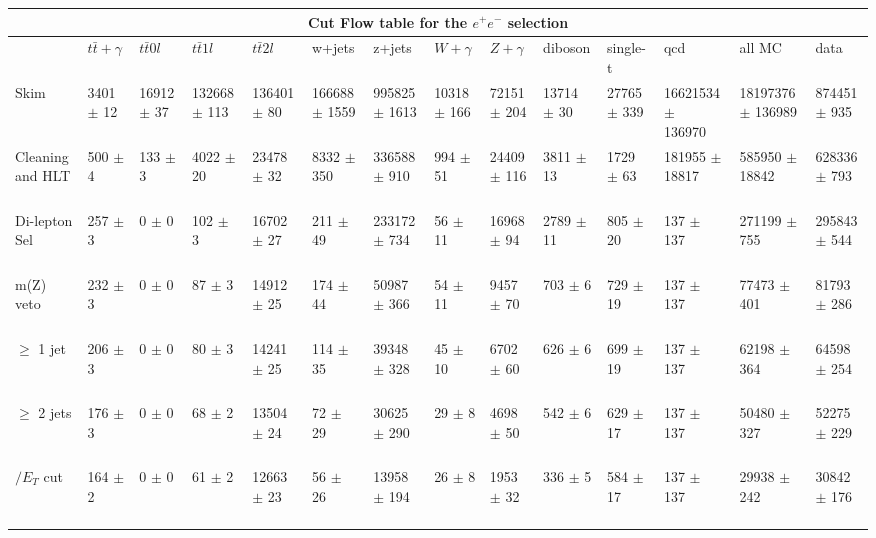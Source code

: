 \begin{table}
  \centering
\resizebox{\columnwidth}{!} {

\begin{tabular}{|l|l|l|l|l|l|l|l|l|l|l|l|l|l|}
\hline
\multicolumn{14}{|c|}{\textbf{Cut Flow table for the $e^+e^-$ selection}} \\
\hline
 & $t\bar{t}+\gamma$ & $t\bar{t} 0l$ & $t\bar{t} 1l$ & $t\bar{t} 2l$ & w+jets & z+jets & $W+\gamma$ & $Z+\gamma$ & diboson & single-t & qcd & all MC & data\\
 \hline
Skim & 3401 $\pm$ 12 \ & 16912 $\pm$ 37 \ & 132668 $\pm$ 113 \ & 136401 $\pm$ 80 \ & 166688 $\pm$ 1559 \ & 995825 $\pm$ 1613 \ & 10318 $\pm$ 166 \ & 72151 $\pm$ 204 \ & 13714 $\pm$ 30 \ & 27765 $\pm$ 339 \ & 16621534 $\pm$ 136970\ & 18197376 $\pm$ 136989 \ & 874451 $\pm$ 935 \\
Cleaning and HLT & 500 $\pm$ 4 \ & 133 $\pm$ 3 \ & 4022 $\pm$ 20 \ & 23478 $\pm$ 32 \ & 8332 $\pm$ 350 \ & 336588 $\pm$ 910 \ & 994 $\pm$ 51 \ & 24409 $\pm$ 116 \ & 3811 $\pm$ 13 \ & 1729 $\pm$ 63 \ & 181955 $\pm$ 18817\ & 585950 $\pm$ 18842 \ & 628336 $\pm$ 793 \\
Di-lepton Sel & 257 $\pm$ 3 \ & 0 $\pm$ 0 \ & 102 $\pm$ 3 \ & 16702 $\pm$ 27 \ & 211 $\pm$ 49 \ & 233172 $\pm$ 734 \ & 56 $\pm$ 11 \ & 16968 $\pm$ 94 \ & 2789 $\pm$ 11 \ & 805 $\pm$ 20 \ & 137 $\pm$ 137\ & 271199 $\pm$ 755 \ & 295843 $\pm$ 544 \\
m(Z) veto & 232 $\pm$ 3 \ & 0 $\pm$ 0 \ & 87 $\pm$ 3 \ & 14912 $\pm$ 25 \ & 174 $\pm$ 44 \ & 50987 $\pm$ 366 \ & 54 $\pm$ 11 \ & 9457 $\pm$ 70 \ & 703 $\pm$ 6 \ & 729 $\pm$ 19 \ & 137 $\pm$ 137\ & 77473 $\pm$ 401 \ & 81793 $\pm$ 286 \\
$\geq$ 1 jet & 206 $\pm$ 3 \ & 0 $\pm$ 0 \ & 80 $\pm$ 3 \ & 14241 $\pm$ 25 \ & 114 $\pm$ 35 \ & 39348 $\pm$ 328 \ & 45 $\pm$ 10 \ & 6702 $\pm$ 60 \ & 626 $\pm$ 6 \ & 699 $\pm$ 19 \ & 137 $\pm$ 137\ & 62198 $\pm$ 364 \ & 64598 $\pm$ 254 \\
$\geq$ 2 jets & 176 $\pm$ 3 \ & 0 $\pm$ 0 \ & 68 $\pm$ 2 \ & 13504 $\pm$ 24 \ & 72 $\pm$ 29 \ & 30625 $\pm$ 290 \ & 29 $\pm$ 8 \ & 4698 $\pm$ 50 \ & 542 $\pm$ 6 \ & 629 $\pm$ 17 \ & 137 $\pm$ 137\ & 50480 $\pm$ 327 \ & 52275 $\pm$ 229 \\
$\slash{E_{T}}$ cut & 164 $\pm$ 2 \ & 0 $\pm$ 0 \ & 61 $\pm$ 2 \ & 12663 $\pm$ 23 \ & 56 $\pm$ 26 \ & 13958 $\pm$ 194 \ & 26 $\pm$ 8 \ & 1953 $\pm$ 32 \ & 336 $\pm$ 5 \ & 584 $\pm$ 17 \ & 137 $\pm$ 137\ & 29938 $\pm$ 242 \ & 30842 $\pm$ 176 \\

\end{tabular}}
\end{table}
